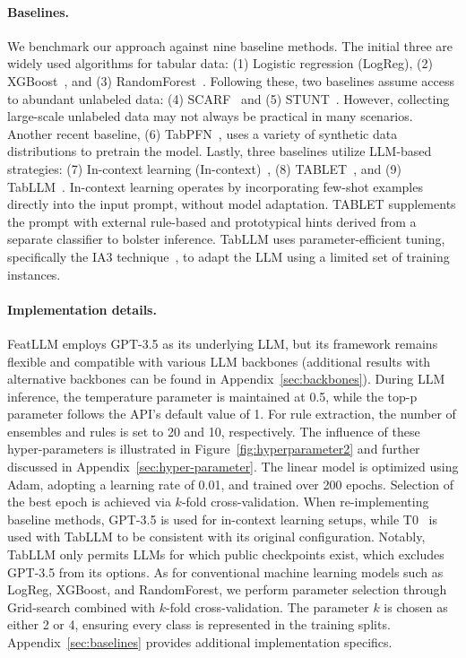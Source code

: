 \vspace*{-0.12in}
\paragraph{Baselines.}
We benchmark our approach against nine baseline methods. The initial three are widely used algorithms for tabular data: (1) Logistic regression (LogReg), (2) XGBoost~\cite{chen2016xgboost}, and (3) RandomForest~\cite{ho1995random}. Following these, two baselines assume access to abundant unlabeled data: (4) SCARF~\cite{bahri2022scarf} and (5) STUNT~\cite{nam2023stunt}. However, collecting large-scale unlabeled data may not always be practical in many scenarios. Another recent baseline, (6) TabPFN~\cite{hollmann2022tabpfn}, uses a variety of synthetic data distributions to pretrain the model. Lastly, three baselines utilize LLM-based strategies: (7) In-context learning (In-context)~\cite{wei2022emergent}, (8) TABLET~\cite{slack2023tablet}, and (9) TabLLM~\cite{hegselmann2023tabllm}. In-context learning operates by incorporating few-shot examples directly into the input prompt, without model adaptation. TABLET supplements the prompt with external rule-based and prototypical hints derived from a separate classifier to bolster inference. TabLLM uses parameter-efficient tuning, specifically the IA3 technique~\cite{liu2022few}, to adapt the LLM using a limited set of training instances.

\vspace*{-0.12in}
\paragraph{Implementation details.}
\textsf{FeatLLM} employs GPT-3.5 as its underlying LLM, but its framework remains flexible and compatible with various LLM backbones (additional results with alternative backbones can be found in Appendix~\ref{sec:backbones}). During LLM inference, the temperature parameter is maintained at 0.5, while the top-p parameter follows the API's default value of 1. For rule extraction, the number of ensembles and rules is set to 20 and 10, respectively. The influence of these hyper-parameters is illustrated in Figure~\ref{fig:hyperparameter2} and further discussed in Appendix~\ref{sec:hyper-parameter}. The linear model is optimized using Adam, adopting a learning rate of 0.01, and trained over 200 epochs. Selection of the best epoch is achieved via $k$-fold cross-validation. When re-implementing baseline methods, GPT-3.5 is used for in-context learning setups, while T0~\cite{sanh2022multitask} is used with TabLLM to be consistent with its original configuration. Notably, TabLLM only permits LLMs for which public checkpoints exist, which excludes GPT-3.5 from its options. As for conventional machine learning models such as LogReg, XGBoost, and RandomForest, we perform parameter selection through Grid-search combined with $k$-fold cross-validation. The parameter $k$ is chosen as either 2 or 4, ensuring every class is represented in the training splits. Appendix~\ref{sec:baselines} provides additional implementation specifics.

